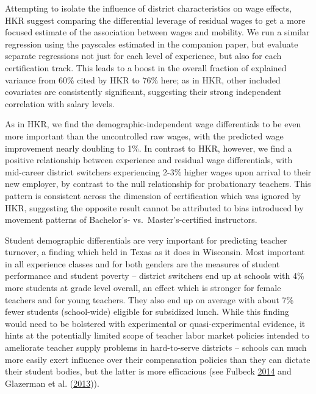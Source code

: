 \documentclass[]{article}
\begin{document}
Attempting to isolate the influence of district characteristics on wage
effects, HKR suggest comparing the differential leverage of residual
wages to get a more focused estimate of the association between wages
and mobility. We run a similar regression using the payscales estimated
in the companion paper, but evaluate separate regressions not just for
each level of experience, but also for each certification track. This
leads to a boost in the overall fraction of explained variance from 60\%
cited by HKR to 76\% here; as in HKR, other included covariates are
consistently significant, suggesting their strong independent
correlation with salary levels.

As in HKR, we find the demographic-independent wage differentials to be
even more important than the uncontrolled raw wages, with the predicted
wage improvement nearly doubling to 1\%. In contrast to HKR, however, we
find a positive relationship between experience and residual wage
differentials, with mid-career district switchers experiencing 2-3\%
higher wages upon arrival to their new employer, by contrast to the null
relationship for probationary teachers. This pattern is consistent
across the dimension of certification which was ignored by HKR,
suggesting the opposite result cannot be attributed to bias introduced
by movement patterns of Bachelor's- vs.~Master's-certified instructors.

Student demographic differentials are very important for predicting
teacher turnover, a finding which held in Texas as it does in Wisconsin.
Most important in all experience classes and for both genders are the
measures of student performance and student poverty -- district
switchers end up at schools with 4\% more students at grade level
overall, an effect which is stronger for female teachers and for young
teachers. They also end up on average with about 7\% fewer students
(school-wide) eligible for subsidized lunch. While this finding would
need to be bolstered with experimental or quasi-experimental evidence,
it hints at the potentially limited scope of teacher labor market
policies intended to ameliorate teacher supply problems in hard-to-serve
districts -- schools can much more easily exert influence over their
compensation policies than they can dictate their student bodies, but
the latter is more efficacious (see Fulbeck
\protect\hyperlink{ref-fulbeck}{2014} and Glazerman et al.
(\protect\hyperlink{ref-glazerman}{2013})).
\end{document}
